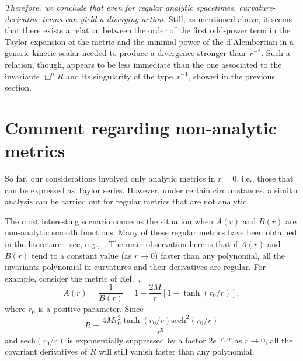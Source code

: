 \documentclass[aps,prd,a4paper,twocolumn,showpacs,showkeys,preprintnumbers,amsmath,amssymb,nofootinbib,usenames,dvipsnames]{revtex4-2}
\def\beq{\begin{equation}}
\def\eeq{\end{equation}}
\begin{document}
{\em Therefore, we conclude that even 
for regular analytic spacetimes, 
curvature-derivative terms can yield a diverging action.} Still, as mentioned above, it seems that there exists a relation between the order of the first odd-power term in the Taylor expansion of the metric and the minimal power of the d'Alembertian in a generic kinetic scalar needed to produce a divergence stronger than~$r^{-2}$. Such a relation, though, appears to be less immediate than the one associated to the invariants $\Box^n R$ and its singularity of the type~$r^{-1}$, showed in the previous section.


\section{Comment regarding non-analytic metrics}
\label{Sec5}

So far, our considerations involved only analytic metrics in $r=0$, {i.e.}, those that can be expressed as Taylor series. However, under certain circumstances, a similar analysis can be carried out for regular metrics that are not analytic.

The most interesting scenario concerns the situation when $A(r)$ and $B(r)$ are non-analytic smooth functions. Many of these regular metrics have been obtained in the literature---see, {e.g.},~\cite{AyonBeato:1999ec,AyonBeato:1999rg,Bronnikov:2000vy,Berej:2006cc,Balart:2014cga}. The main observation here is that if $A(r)$ and $B(r)$ tend to a constant value (as $r\to 0$) faster than any polynomial, all the invariants polynomial in curvatures and their derivatives are regular. For example, consider the metric of Ref.~\cite{Bronnikov:2000vy},
\beq
A (r) = \frac{1}{B(r)} = 1 - \frac{ 2 M }{r} \left[ 1 - \tanh ( r_0/r ) \right] ,
\eeq
where $r_0$ is a positive parameter. Since
%
\beq
R = \frac{4 M r_0^2 \tanh(r_0/r) \text{sech}^2(r_0/r) }{r^5}
\eeq
and $\text{sech}(r_0/r)$ is exponentially suppressed by a factor $2e^{-r_0/r}$ as $r\to 0$, all the covariant derivatives of $R$ will still vanish faster than any polynomial.
\end{document}
